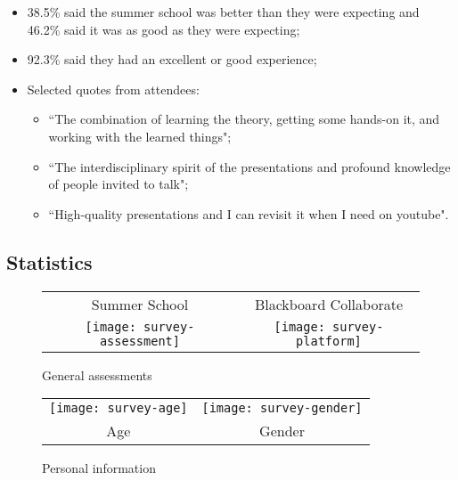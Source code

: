 \begin{itemize}

\item 38.5\% said the summer school was better than they were expecting and 46.2\% said it was as good as they were expecting;

\item 92.3\% said they had an excellent or good experience;

\item Selected quotes from attendees:

\begin{itemize}

\item ``The combination of learning the theory, getting some hands-on it, and working with the learned things";
\item ``The interdisciplinary spirit of the presentations and profound knowledge of people invited to talk";
\item ``High-quality presentations and I can revisit it when I need on youtube".

\end{itemize}

\end{itemize}

\subsection{Statistics}

\begin{figure}[H]
\centering
\begin{tabular}{cc}
Summer School & \hspace{1cm} Blackboard Collaborate \\
\hspace{-2.5cm} \texttt{[image: survey-assessment]} &
\texttt{[image: survey-platform]}
\end{tabular}
\caption{General assessments}
\end{figure}

\begin{figure}[H]
\centering
\begin{tabular}{cc}
\texttt{[image: survey-age]} &
\texttt{[image: survey-gender]} \\
\hspace{-3.5cm} Age & \hspace{-3cm} Gender
\end{tabular}
\caption{Personal information}
\end{figure}

